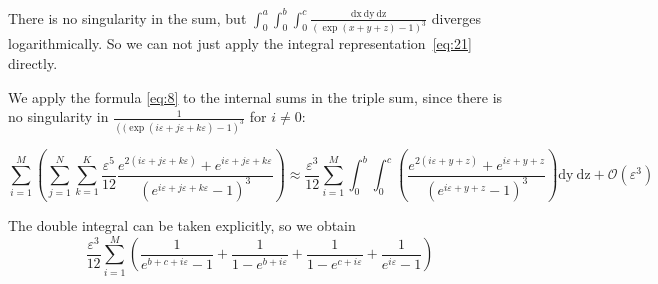 \documentclass{article}
\newcommand{\dx}{\mathrm{dx}~}
\newcommand{\dy}{\mathrm{dy}~}
\newcommand{\dz}{\mathrm{dz}}
\begin{document}
There is no singularity in the sum, but
$\int_{0}^{a} \int_{0}^{b}\int_{0}^{c}\frac{\dx \dy \dz}{(\exp(x+y+z)-1)^{3}}$ diverges
logarithmically. So we can not just apply the integral representation~\eqref{eq:21} directly.

We apply the formula \eqref{eq:8} to the internal sums in the triple sum, since there is no
singularity in $\frac{1}{\left((\exp(i\varepsilon+j\varepsilon+k\varepsilon)-1\right)^{3}}$ for
$i\neq 0$:

\begin{equation}
  \label{eq:9}
\sum_{i=1}^{M}\left(\sum_{j=1}^{N}\sum_{k=1}^{K}\frac{\varepsilon^{5}}{12}
      \frac{e^{2(i\varepsilon+j\varepsilon+k\varepsilon)}+e^{i\varepsilon+j\varepsilon+k\varepsilon}}{\left(e^{i\varepsilon+j\varepsilon+k\varepsilon}-1\right)^{3}}  \right)\approx
    \frac{\varepsilon^{3}}{12}\sum_{i=1}^{M} \int_{0}^{b}\int_{0}^{c}
      \left(\frac{e^{2(i\varepsilon+y+z)}+e^{i\varepsilon+y+z}}{\left(e^{i\varepsilon+y+z}-1\right)^{3}}\right) \dy \dz+\mathcal{O}(\varepsilon^{3})
\end{equation}

The double integral can be taken explicitly, so we obtain
\begin{equation}
  \label{eq:11}
  \frac{\varepsilon^{3}}{12}\sum_{i=1}^{M}\left(     \frac{1}{e^{b+c+i\varepsilon}-1}+
  \frac{1}{1-e^{b+i\varepsilon}}+\frac{1}{1-e^{c+i\varepsilon}}+\frac{1}{e^{i\varepsilon}-1}\right)
\end{equation}
\end{document}
